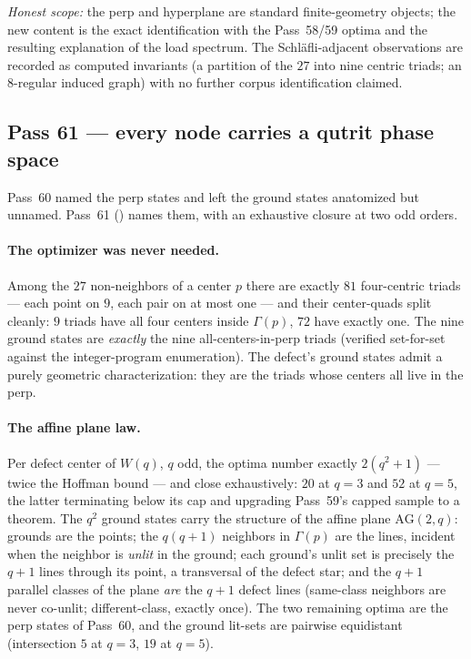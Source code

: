 \documentclass[11pt]{article}
\begin{document}
\emph{Honest scope:} the perp and hyperplane are standard finite-geometry
objects; the new content is the exact identification with the Pass~58/59
optima and the resulting explanation of the load spectrum.  The
Schl\"afli-adjacent observations are recorded as computed invariants (a
partition of the \(27\) into nine centric triads; an \(8\)-regular induced
graph) with no further corpus identification claimed.

\subsection{Pass 61 --- every node carries a qutrit phase space}
\label{sec:capstone-sixtyone}

Pass~60 named the perp states and left the ground states anatomized but
unnamed.  Pass~61 () names them, with
an exhaustive closure at two odd orders.

\paragraph{The optimizer was never needed.}  Among the \(27\) non-neighbors of
a center \(p\) there are exactly \(81\) four-centric triads --- each point on
\(9\), each pair on at most one --- and their center-quads split cleanly:
\(9\) triads have all four centers inside \(\Gamma(p)\), \(72\) have exactly
one.  The nine ground states are \emph{exactly} the nine all-centers-in-perp
triads (verified set-for-set against the integer-program enumeration).  The
defect's ground states admit a purely geometric characterization: they are the
triads whose centers all live in the perp.

\paragraph{The affine plane law.}  Per defect center of \(W(q)\), \(q\) odd,
the optima number exactly \(2(q^2+1)\) --- twice the Hoffman bound --- and
close exhaustively: \(20\) at \(q=3\) and \(52\) at \(q=5\), the latter
terminating below its cap and upgrading Pass~59's capped sample to a theorem.
The \(q^2\) ground states carry the structure of the affine plane
\(\mathrm{AG}(2,q)\): grounds are the points; the \(q(q+1)\) neighbors in
\(\Gamma(p)\) are the lines, incident when the neighbor is \emph{unlit} in the
ground; each ground's unlit set is precisely the \(q+1\) lines through its
point, a transversal of the defect star; and the \(q+1\) parallel classes of
the plane \emph{are} the \(q+1\) defect lines (same-class neighbors are never
co-unlit; different-class, exactly once).  The two remaining optima are the
perp states of Pass~60, and the ground lit-sets are pairwise equidistant
(intersection \(5\) at \(q=3\), \(19\) at \(q=5\)).
\end{document}
